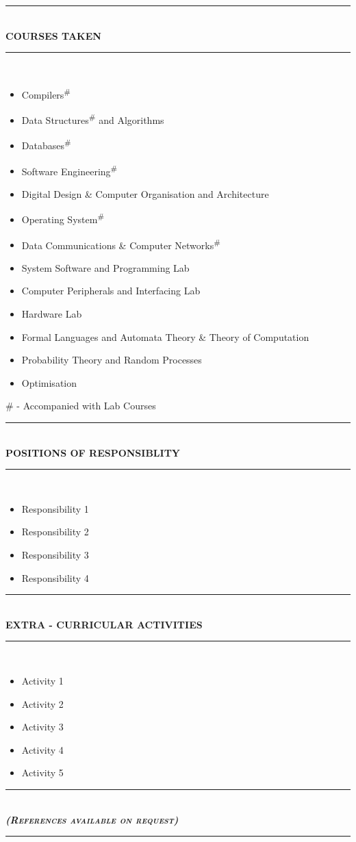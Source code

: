 \documentclass[a4paper,8pt]{article}
\newcommand{\resheading}[1]{

\begin{center}
\rule{\textwidth}{1pt}\vspace{-3pt}\\
	\textsc{{\textbf{#1}}}\vspace{-8pt}\\
\rule{\textwidth}{1pt}\\
\end{center}
\vspace{-5pt}
}
\begin{document}
\resheading{\textbf{COURSES TAKEN} }
\vspace{-8pt}
\begin{multicols}{2}
\begin{itemize}
	\setlength\itemsep{0.05em}
	\item Compilers\textsuperscript{\#}
	\item Data Structures\textsuperscript{\#} and Algorithms
	\item Databases\textsuperscript{\#}
	\item Software Engineering\textsuperscript{\#}
	\item Digital Design \& Computer Organisation and Architecture 
	\item Operating System\textsuperscript{\#}
	\item Data Communications \& Computer Networks\textsuperscript{\#}
	\item System Software and Programming Lab
	\item Computer Peripherals and Interfacing Lab
	\item Hardware Lab
	\item Formal Languages and Automata Theory \& Theory of Computation
	\item Probability Theory and Random Processes
	\item Optimisation 
\end{itemize}
\end{multicols}
\small \# - Accompanied with Lab Courses
\resheading{\textbf{POSITIONS OF RESPONSIBLITY} }
\begin{itemize}
	\setlength\itemsep{0.05em}
\item \noindent Responsibility 1
\item \noindent Responsibility 2
\item \noindent Responsibility 3
\item \noindent Responsibility 4
\end{itemize}

\resheading{\textbf{EXTRA - CURRICULAR ACTIVITIES} }
\begin{itemize}
	\setlength\itemsep{0.05em}
\item \noindent Activity 1
\item \noindent Activity 2
\item \noindent Activity 3
\item \noindent Activity 4
\item \noindent  Activity 5
\end{itemize}
\resheading{\textit{\textbf{(References available on request)}}}
\end{document}
